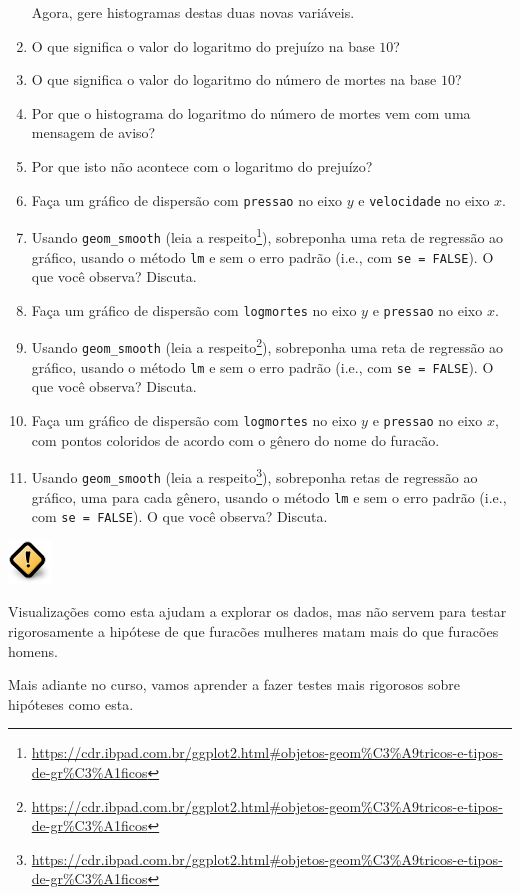 \documentclass[
  11pt]{report}
\DeclareRobustCommand{\href}[2]{#2\footnote{\url{#1}}}
\newenvironment{rmdcaution}
{
  \begin{mycaution}
    \includegraphics{images/caution.png}
    \tcblower
  }
  {
  \end{mycaution}
}
\begin{document}
\begin{enumerate}
  Agora, gere histogramas destas duas novas variáveis.
\item
  O que significa o valor do logaritmo do prejuízo na base $10$?
\item
  O que significa o valor do logaritmo do número de mortes na base $10$?
\item
  Por que o histograma do logaritmo do número de mortes vem com uma mensagem de aviso?
\item
  Por que isto não acontece com o logaritmo do prejuízo?
\item
  Faça um gráfico de dispersão com \texttt{pressao} no eixo $y$ e \texttt{velocidade} no eixo $x$.
\item
  Usando \texttt{geom\_smooth} (\href{https://cdr.ibpad.com.br/ggplot2.html\#objetos-geom\%C3\%A9tricos-e-tipos-de-gr\%C3\%A1ficos}{leia a respeito}), sobreponha uma reta de regressão ao gráfico, usando o método \texttt{lm} e sem o erro padrão (i.e., com \texttt{se\ =\ FALSE}). O que você observa? Discuta.
\item
  Faça um gráfico de dispersão com \texttt{logmortes} no eixo $y$ e \texttt{pressao} no eixo $x$.
\item
  Usando \texttt{geom\_smooth} (\href{https://cdr.ibpad.com.br/ggplot2.html\#objetos-geom\%C3\%A9tricos-e-tipos-de-gr\%C3\%A1ficos}{leia a respeito}), sobreponha uma reta de regressão ao gráfico, usando o método \texttt{lm} e sem o erro padrão (i.e., com \texttt{se\ =\ FALSE}). O que você observa? Discuta.
\item
  Faça um gráfico de dispersão com \texttt{logmortes} no eixo $y$ e \texttt{pressao} no eixo $x$, com pontos coloridos de acordo com o gênero do nome do furacão.
\item
  Usando \texttt{geom\_smooth} (\href{https://cdr.ibpad.com.br/ggplot2.html\#objetos-geom\%C3\%A9tricos-e-tipos-de-gr\%C3\%A1ficos}{leia a respeito}), sobreponha retas de regressão ao gráfico, uma para cada gênero, usando o método \texttt{lm} e sem o erro padrão (i.e., com \texttt{se\ =\ FALSE}). O que você observa? Discuta.
\end{enumerate}

\begin{rmdcaution}
Visualizações como esta ajudam a explorar os dados, mas não servem para testar rigorosamente a hipótese de que furacões mulheres matam mais do que furacões homens.

Mais adiante no curso, vamos aprender a fazer testes mais rigorosos sobre hipóteses como esta.

\end{rmdcaution}
\end{document}
